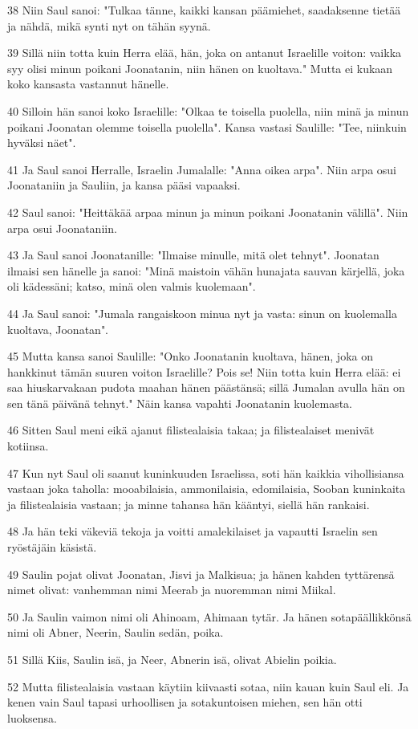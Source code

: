 \par 38 Niin Saul sanoi: "Tulkaa tänne, kaikki kansan päämiehet, saadaksenne tietää ja nähdä, mikä synti nyt on tähän syynä.
\par 39 Sillä niin totta kuin Herra elää, hän, joka on antanut Israelille voiton: vaikka syy olisi minun poikani Joonatanin, niin hänen on kuoltava." Mutta ei kukaan koko kansasta vastannut hänelle.
\par 40 Silloin hän sanoi koko Israelille: "Olkaa te toisella puolella, niin minä ja minun poikani Joonatan olemme toisella puolella". Kansa vastasi Saulille: "Tee, niinkuin hyväksi näet".
\par 41 Ja Saul sanoi Herralle, Israelin Jumalalle: "Anna oikea arpa". Niin arpa osui Joonataniin ja Sauliin, ja kansa pääsi vapaaksi.
\par 42 Saul sanoi: "Heittäkää arpaa minun ja minun poikani Joonatanin välillä". Niin arpa osui Joonataniin.
\par 43 Ja Saul sanoi Joonatanille: "Ilmaise minulle, mitä olet tehnyt". Joonatan ilmaisi sen hänelle ja sanoi: "Minä maistoin vähän hunajata sauvan kärjellä, joka oli kädessäni; katso, minä olen valmis kuolemaan".
\par 44 Ja Saul sanoi: "Jumala rangaiskoon minua nyt ja vasta: sinun on kuolemalla kuoltava, Joonatan".
\par 45 Mutta kansa sanoi Saulille: "Onko Joonatanin kuoltava, hänen, joka on hankkinut tämän suuren voiton Israelille? Pois se! Niin totta kuin Herra elää: ei saa hiuskarvakaan pudota maahan hänen päästänsä; sillä Jumalan avulla hän on sen tänä päivänä tehnyt." Näin kansa vapahti Joonatanin kuolemasta.
\par 46 Sitten Saul meni eikä ajanut filistealaisia takaa; ja filistealaiset menivät kotiinsa.
\par 47 Kun nyt Saul oli saanut kuninkuuden Israelissa, soti hän kaikkia vihollisiansa vastaan joka taholla: mooabilaisia, ammonilaisia, edomilaisia, Sooban kuninkaita ja filistealaisia vastaan; ja minne tahansa hän kääntyi, siellä hän rankaisi.
\par 48 Ja hän teki väkeviä tekoja ja voitti amalekilaiset ja vapautti Israelin sen ryöstäjäin käsistä.
\par 49 Saulin pojat olivat Joonatan, Jisvi ja Malkisua; ja hänen kahden tyttärensä nimet olivat: vanhemman nimi Meerab ja nuoremman nimi Miikal.
\par 50 Ja Saulin vaimon nimi oli Ahinoam, Ahimaan tytär. Ja hänen sotapäällikkönsä nimi oli Abner, Neerin, Saulin sedän, poika.
\par 51 Sillä Kiis, Saulin isä, ja Neer, Abnerin isä, olivat Abielin poikia.
\par 52 Mutta filistealaisia vastaan käytiin kiivaasti sotaa, niin kauan kuin Saul eli. Ja kenen vain Saul tapasi urhoollisen ja sotakuntoisen miehen, sen hän otti luoksensa.

